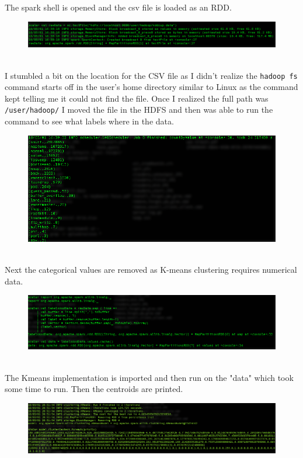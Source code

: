 \documentclass[10pt]{article}
\begin{document}
\indent The spark shell is opened and the csv file is loaded as an RDD.
\begin{figure}[!h]
\includegraphics[scale=0.37]{RDD.png}
\centering
\end{figure}\\
\indent  I stumbled a bit on the location for the CSV file as I didn't realize the \verb|hadoop fs| command starts off in the user's home directory similar to Linux as the command kept telling me it could not find the file. Once I realized the full path was \verb|/user/hadoop/| I moved the file in the HDFS and then was able to run the command to see what labels where in the data.
\pagebreak
\begin{figure}[!h]
\includegraphics[scale=0.37]{labels.png}
\centering
\end{figure}\\
\indent Next the categorical values are removed as K-means clustering requires numerical data.
\begin{figure}[!h]
\includegraphics[scale=0.37]{removeLabels.png}
\centering
\end{figure}\\
\indent The Kmeans implementation is imported and then run on the "data" which took some time to run. Then the centroids are printed.
\begin{figure}[!h]
\includegraphics[scale=0.37]{printCentroids.png}
\centering
\end{figure}\\
\end{document}
